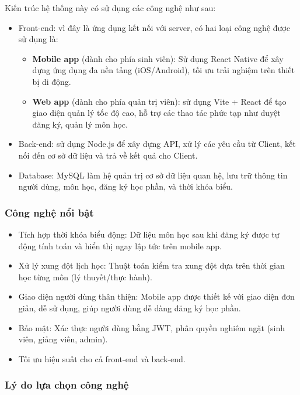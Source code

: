 \documentclass[../main.tex]{subfiles}
\begin{document}

Kiến trúc hệ thống này có sử dụng các công nghệ như sau:

\begin{itemize}
    \item Front-end: vì đây là ứng dụng kết nối với server, có hai loại công nghệ được sử dụng là:
    \begin{itemize}
        \item \textbf{Mobile app} (dành cho phía sinh viên): Sử dụng React Native để xây dựng ứng dụng đa nền tảng (iOS/Android), tối ưu trải nghiệm trên thiết bị di động.
        \item \textbf{Web app} (dành cho phía  quản trị viên): sử dụng Vite + React để tạo giao diện quản lý tốc độ cao, hỗ trợ các thao tác phức tạp như duyệt đăng ký, quản lý môn học.
    \end{itemize}
    \item Back-end: sử dụng Node.js để xây dựng API, xử lý các yêu cầu từ Client, kết nối đến cơ sở dữ liệu và trả về kết quả cho Client.
    \item Database: MySQL làm hệ quản trị cơ sở dữ liệu quan hệ, lưu trữ thông tin người dùng, môn học, đăng ký học phần, và thời khóa biểu.
\end{itemize}

\subsubsection*{Công nghệ nổi bật}

\begin{itemize}
    \item Tích hợp thời khóa biểu động: Dữ liệu môn học sau khi đăng ký được tự động tính toán và hiển thị ngay lập tức trên mobile app.
    \item Xử lý xung đột lịch học: Thuật toán kiểm tra xung đột dựa trên thời gian học từng môn (lý thuyết/thực hành).
    \item Giao diện người dùng thân thiện: Mobile app được thiết kế với giao diện đơn giản, dễ sử dụng, giúp người dùng dễ dàng đăng ký học phần.
    \item Bảo mật: Xác thực người dùng bằng JWT, phân quyền nghiêm ngặt (sinh viên, giảng viên, admin).
    \item Tối ưu hiệu suất cho cả front-end và back-end.
\end{itemize}

\subsubsection*{Lý do lựa chọn công nghệ}
\end{document}
